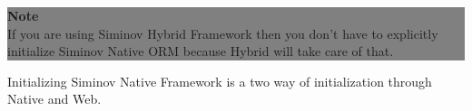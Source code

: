	
		\begin{center}
			\colorbox{grey}{
				\parbox[t]{.8\linewidth}{
					\fontsize{11pt}{11pt}\selectfont %
					\vspace*{0.1cm} %
		
					\hfill \textbf{Note} \\
					If you are using Siminov Hybrid Framework then you don't have to explicitly initialize Siminov Native ORM because Hybrid will take care of that.

					\vspace*{0.0cm} %
				}
			}

		\end{center}


Initializing Siminov Native Framework is a two way of initialization through Native and Web.


